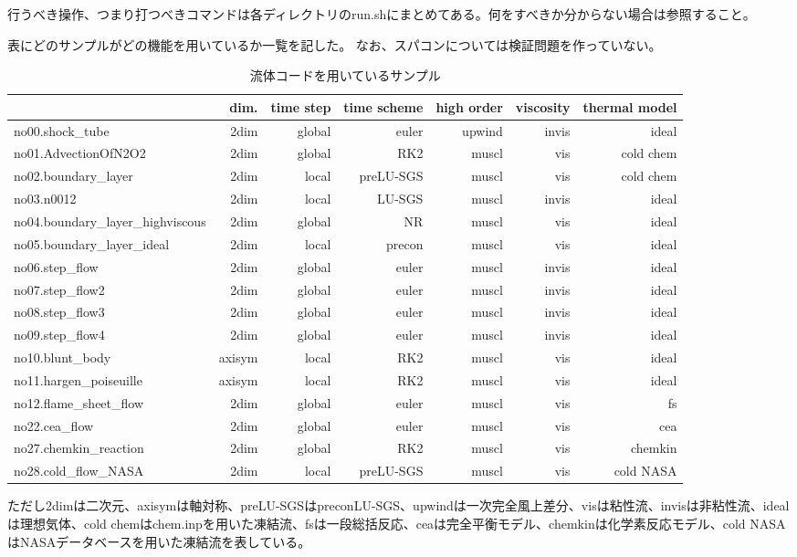 \documentclass{jsarticle}
\begin{document}
行うべき操作、つまり打つべきコマンドは各ディレクトリのrun.shにまとめてある。何をすべきか分からない場合は参照すること。

表にどのサンプルがどの機能を用いているか一覧を記した。
なお、スパコンについては検証問題を作っていない。
\begin{table}[b]%
\centering
\caption{流体コードを用いているサンプル}
\begin{tabular}{lrrrrrr}
 & dim. & time step & time scheme & high order & viscosity & thermal model\\
\hline
no00.shock\_tube                  & 2dim   & global & euler     & upwind & invis & ideal \\
no01.AdvectionOfN2O2              & 2dim   & global & RK2       & muscl  & vis   & cold chem \\
no02.boundary\_layer              & 2dim   & local  & preLU-SGS & muscl  & vis   & cold chem \\
no03.n0012                        & 2dim   & local  & LU-SGS    & muscl  & invis & ideal \\
no04.boundary\_layer\_highviscous & 2dim   & global & NR        & muscl  & vis   & ideal \\
no05.boundary\_layer\_ideal       & 2dim   & local  & precon    & muscl  & vis   & ideal \\
no06.step\_flow                   & 2dim   & global & euler     & muscl  & invis & ideal \\
no07.step\_flow2                  & 2dim   & global & euler     & muscl  & invis & ideal \\
no08.step\_flow3                  & 2dim   & global & euler     & muscl  & invis & ideal \\
no09.step\_flow4                  & 2dim   & global & euler     & muscl  & invis & ideal \\
no10.blunt\_body                  & axisym & local  & RK2       & muscl  & vis   & ideal \\
no11.hargen\_poiseuille           & axisym & local  & RK2       & muscl  & vis   & ideal \\
no12.flame\_sheet\_flow           & 2dim   & global & euler     & muscl  & vis   & fs \\
no22.cea\_flow                    & 2dim   & global & euler     & muscl  & vis   & cea \\
no27.chemkin\_reaction            & 2dim   & global & RK2       & muscl  & vis   & chemkin \\
no28.cold\_flow\_NASA             & 2dim   & local  & preLU-SGS & muscl  & vis   & cold NASA \\
\hline
\end{tabular}
\flushleft
ただし2dimは二次元、axisymは軸対称、preLU-SGSはpreconLU-SGS、upwindは一次完全風上差分、visは粘性流、invisは非粘性流、idealは理想気体、cold chemはchem.inpを用いた凍結流、fsは一段総括反応、ceaは完全平衡モデル、chemkinは化学素反応モデル、cold NASAはNASAデータベースを用いた凍結流を表している。
\end{table}
\end{document}

